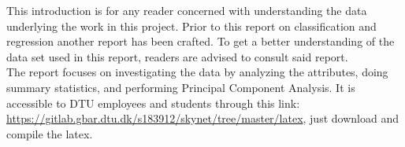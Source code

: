 This introduction is for any reader concerned with understanding the data underlying the work in this project.
Prior to this report on classification and regression another report has been crafted. 
To get a better understanding of the data set used in this report, readers are advised to consult said report.\\
The report focuses on investigating the data by analyzing the attributes, doing summary statistics, and performing Principal Component Analysis.
It is accessible to DTU employees and students through this link: \url{https://gitlab.gbar.dtu.dk/s183912/skynet/tree/master/latex}, just download and compile the latex.
